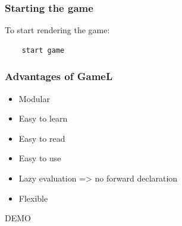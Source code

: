 \documentclass{beamer}
\begin{document}
\begin{frame}[fragile]
    \frametitle{Starting the game}
    To start rendering the game:
    \begin{lstlisting}
    start game
    \end{lstlisting}
\end{frame}

\begin{frame}
    \frametitle{Advantages of GameL}
    \begin{itemize}[<+->]
        \item{Modular}
        \item{Easy to learn}
        \item{Easy to read}
        \item{Easy to use}
        \item{Lazy evaluation => no forward declaration}
        \item{Flexible}
    \end{itemize}
\end{frame}

\begin{frame}[plain,c]
    \begin{center}
        \Huge DEMO
    \end{center}
\end{frame}
\end{document}
